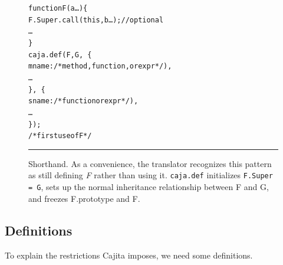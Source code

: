 \documentclass[letterpaper,twocolumn,10pt]{article}
\newcommand{\code}[1]{{\tt {#1}}}              %
\begin{document}
\begin{figure}[t!]
\begin{alltt}
function F(a\ldots)\{
  F.Super.call(this,b\ldots); //optional
  \ldots
\}
caja.def(F, G,\ \{
  mname: /*method, function, or expr*/),
  \ldots
\},\ \{
  sname: /*function or expr*/),
  \ldots
\});
/*first use of F*/
\end{alltt}

\caption[Shorthand.]{Shorthand. As a convenience, the translator recognizes 
this pattern as still defining \emph{F} rather than using it. \code{caja.def}
initializes \code{F.Super = G}, sets up the normal inheritance relationship
between F and G, and freezes F.prototype and F. \\ } \hrule
\label{fig:shorthand}
\end{figure}


\subsection{Definitions}

To explain the restrictions Cajita imposes, we need some definitions.
\end{document}
